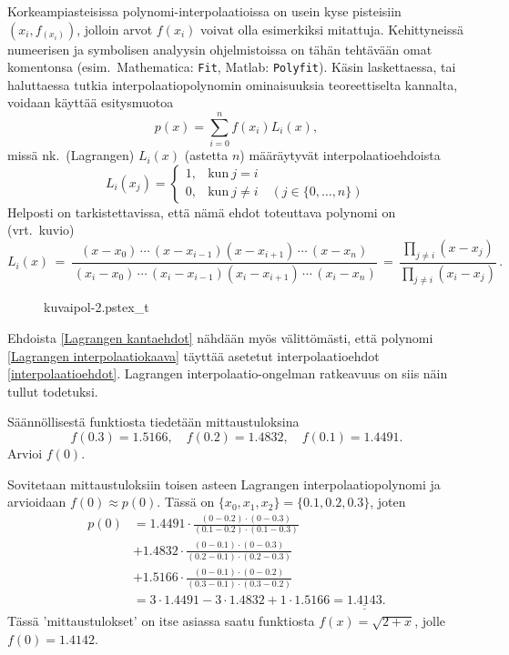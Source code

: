 Korkeampiasteisissa polynomi-interpolaatioissa on usein kyse  
pisteisiin $(x_i,f_(x_i))$, jolloin arvot $f(x_i)$ voivat olla esimerkiksi mitattuja. 
Kehittyneissä numeerisen ja symbolisen analyysin ohjelmistoissa on tähän tehtävään omat 
komentonsa (esim.\ Mathematica: \verb|Fit|, Matlab: \verb|Polyfit|). Käsin laskettaessa, tai
haluttaessa tutkia interpolaatiopolynomin ominaisuuksia teoreettiselta kannalta, voidaan
käyttää esitysmuotoa
\begin{equation} \label{Lagrangen interpolaatiokaava}
p(x)=\sum_{i=0}^n f(x_i)L_i(x),
\end{equation}
missä nk.\ (Lagrangen)  $L_i(x)$ (astetta $n$) määräytyvät 
interpolaatioehdoista
\begin{equation} \label{Lagrangen kantaehdot}
L_i(x_j)=\begin{cases} 
         1, &\text{kun}\  j=i \\ 0, &\text{kun}\ j\neq i \quad (j \in \{0, \ldots, n\}) 
         \end{cases}
\end{equation}
Helposti on tarkistettavissa, että nämä ehdot toteuttava polynomi on (vrt.\ kuvio)
\[
L_i(x) \,=\, \frac{(x-x_0)\,\cdots\,(x-x_{i-1})(x-x_{i+1})\,\cdots\,(x-x_n)}
               {\,(x_i-x_0)\,\cdots\,(x_i-x_{i-1})(x_i-x_{i+1})\,\cdots\,(x_i-x_n)}
       \,=\, \frac{\prod_{j \neq i} (x-x_j)}{\prod_{j \neq i} (x_i-x_j)}\,.
\]
\begin{figure}[H]
\begin{center}
{kuvaipol-2.pstex_t}
\end{center}
\end{figure}
Ehdoista \eqref{Lagrangen kantaehdot} nähdään myös välittömästi, että polynomi 
\eqref{Lagrangen interpolaatiokaava} täyttää asetetut interpolaatioehdot 
\eqref{interpolaatioehdot}. Lagrangen interpolaatio-ongelman ratkeavuus on siis näin tullut 
todetuksi.
\begin{Exa} \label{interpolaatioesimerkki}
Säännöllisestä funktiosta tiedetään mittaustuloksina
\[
f(0.3)=1.5166,\quad f(0.2)=1.4832,\quad f(0.1)=1.4491.
\]
Arvioi $f(0)$.
\end{Exa}
\ratk Sovitetaan mittaustuloksiin toisen asteen Lagrangen interpolaatiopolynomi ja arvioidaan 
$f(0)\approx p(0)$. Tässä on $\{x_0,x_1,x_2\}=\{0.1,0.2,0.3\}$, joten
\begin{align*}
p(0) &= 1.4491\cdot\frac{(0-0.2)\cdot (0-0.3)}{(0.1-0.2)\cdot (0.1-0.3)} \\
&+ 1.4832\cdot\frac{(0-0.1)\cdot (0-0.3)}{(0.2-0.1)\cdot (0.2-0.3)} \\
&+ 1.5166\cdot\frac{(0-0.1)\cdot (0-0.2)}{(0.3-0.1)\cdot (0.3-0.2)} \\
&= 3\cdot 1.4491-3\cdot 1.4832+1\cdot 1.5166=\underline{\underline{1.4143}}.
\end{align*}
Tässä 'mittaustulokset' on itse asiassa saatu funktiosta $f(x)=\sqrt{2+x}$, jolle $f(0)=1.4142$.
\loppu

